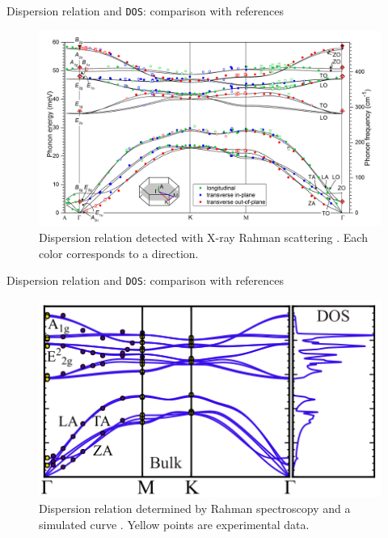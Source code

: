 \documentclass[dvipsnames]{beamer}
\begin{document}
	\begin{frame}{Dispersion relation and \texttt{DOS}: comparison with references}
	\begin{figure}
	\includegraphics[height=0.7\textheight]{graphs/phonon_dispersion.png}
	\caption{Dispersion relation detected with X-ray Rahman scattering \cite{Hans}. Each color corresponds to a direction.}
	\end{figure}
	\end{frame}
	
	\begin{frame}{Dispersion relation and \texttt{DOS}: comparison with references}
	\begin{figure}
	\includegraphics[height=0.4\textheight]{graphs/bulk_dos.png}
	\caption{Dispersion relation determined by Rahman spectroscopy and a simulated curve \cite{Molina}. Yellow points are experimental data.}
	\end{figure}
	\end{frame}
	
\end{document}
